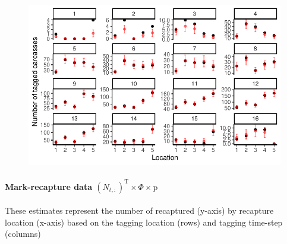 \documentclass[
  letterpaper,
  DIV=11,
  numbers=noendperiod]{scrartcl}
\let\oldparagraph\paragraph
\renewcommand{\paragraph}[1]{\oldparagraph{#1}\mbox{}}
\begin{document}
\begin{figure}[H]

{\centering \includegraphics{KaleDoc_files/figure-pdf/unnamed-chunk-6-1.pdf}

}

\end{figure}

\hypertarget{mark-recapture-data-n_tmathrmt-times-phi-times-mathrmp}{%
\paragraph{\texorpdfstring{Mark-recapture data
\((N_{t,:})^\mathrm{T} \times \Phi \times \mathrm{p}\)}{Mark-recapture data (N\_\{t,:\})\^{}\textbackslash mathrm\{T\} \textbackslash times \textbackslash Phi \textbackslash times \textbackslash mathrm\{p\}}}\label{mark-recapture-data-n_tmathrmt-times-phi-times-mathrmp}}

These estimates represent the number of recaptured (y-axis) by recapture
location (x-axis) based on the tagging location (rows) and tagging
time-step (columns)
\end{document}
